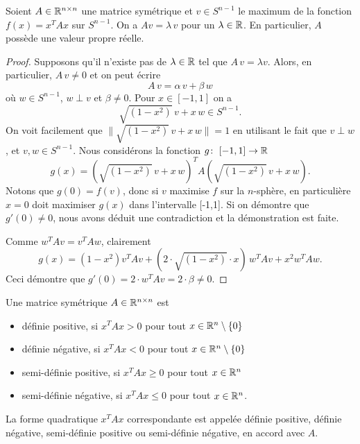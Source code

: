\begin{lemma}
  \label{lem:7}
  Soient $A \in \mathbb{R}^{n \times n}$ une matrice symétrique et $v \in S^{n-1}$ le maximum de la fonction $f(x) = x^TAx$ sur $S^{n-1}$. On a $Av = \lambda\, v$ pour  un $\lambda \in \mathbb{R}$. En particulier, $A$ possède une valeur propre réelle. 
\end{lemma}

\begin{proof}
  Supposons qu'il n'existe pas de $\lambda \in \mathbb{R}$  tel que $A\,v  =  \lambda v$. Alors,  en particulier, $A\, v \neq 0$ et on peut écrire 
  \begin{displaymath}
    A\,v = \alpha \, v + \beta \, w
  \end{displaymath}
où $w \in S^{n-1}$, $w \perp v$ et $\beta \neq 0$. Pour $x \in [-1,1]$ on a 
\begin{displaymath}
  \sqrt{(1 - x^2)} \,v + x\, w \in S^{n-1}.
\end{displaymath}On voit facilement que $\|\sqrt{(1 - x^2)} \,v + x\, w\|=1$ en utilisant le fait que $v\perp w$, et $v,w\in S^{n-1}$.
Nous considérons  la fonction $g\colon\; [-1,1] \rightarrow \mathbb{R}$ 
\begin{displaymath}
  g(x) = \left(\sqrt{(1 - x^2)} \,v + x\, w \right)^T A \left(\sqrt{(1 - x^2)} \,v + x\, w \right). 
\end{displaymath}
Notons que $g(0)=f(v)$, donc si $v$ maximise $f$ sur la $n$-sphère, en particulière $x=0$ doit maximiser $g(x)$ dans l'intervalle [-1,1]. Si on démontre que $g'(0) \neq 0$, nous avons déduit une contradiction et la démonstration est faite. 

Comme $w^TAv = v^TAw$, clairement 
\begin{displaymath}
  g(x) = (1-x^2) v^T A v + (2 \cdot \sqrt{(1 - x^2)} \cdot x) \, w^T A v + x^2 w^TAw.
\end{displaymath}
Ceci démontre que $g'(0) = 2 \cdot w^T A v = 2 \cdot \beta  \neq 0$. 

\end{proof}





\begin{definition}
  \label{def:f22}
  Une matrice symétrique $A \in \mathbb{R}^{n \times n}$ est 
  \begin{itemize}
  \item définie positive, si $x^TAx>0$ pour tout $x \in \mathbb{R}^n \setminus  \{0\}$ 
  \item définie négative, si $x^TAx<0$ pour tout $x \in \mathbb{R}^n \setminus  \{0\}$ 
  \item semi-définie positive, si $x^TAx\geq 0$ pour tout $x \in \mathbb{R}^n$ 
  \item semi-définie négative, si $x^TAx\leq 0$ pour tout $x \in \mathbb{R}^n$.  
  \end{itemize}
  La forme quadratique $x^TAx$ correspondante est appelée définie positive, définie négative, semi-définie positive ou semi-définie négative, en accord avec $A$. 
\end{definition}



